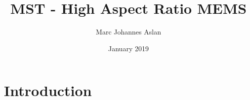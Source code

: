 \documentclass{article}
\title{MST - High Aspect Ratio MEMS}
\author{Marc Johannes Aslan}
\date{January 2019}
\begin{document}
\maketitle

\section{Introduction}
\end{document}
